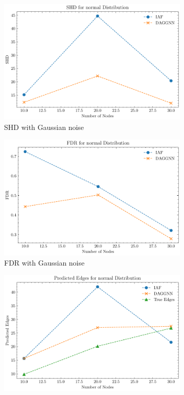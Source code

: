 \documentclass[10pt]{article}
\begin{document}
\begin{figure}[H]
    \centering
    \begin{subfigure}{0.3\textwidth}
        \includegraphics[width=\textwidth]{fig/SHD_independence_normal.pdf}
        \caption{SHD with Gaussian noise}
        \label{SHD_gaussian}
    \end{subfigure}
    \hfill
    \begin{subfigure}{0.3\textwidth}
        \includegraphics[width=\textwidth]{fig/FDR_independence_normal.pdf}
        \caption{FDR with Gaussian noise}
        \label{FDR_gaussian}
    \end{subfigure}
    \hfill
    \begin{subfigure}{0.3\textwidth}
        \includegraphics[width=\textwidth]{fig/Predicted Edges_independence_normal.pdf}

\end{subfigure}
\end{figure}
\end{document}
